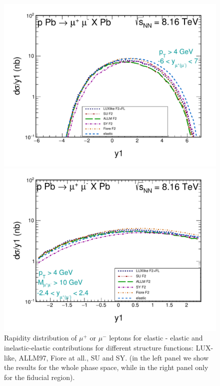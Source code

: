 \begin{figure}[!htbp]
\begin{minipage}{0.47\textwidth}
 \centerline{\includegraphics[width=1.0\textwidth]{figures_Marta/y1.pdf}}
\end{minipage}
\begin{minipage}{0.47\textwidth}
 \centerline{\includegraphics[width=1.0\textwidth]{figures_Marta/y1-c.pdf}}
\end{minipage}

\caption{
Rapidity distribution of $\mu^+$ or $\mu^-$ leptons
for elastic - elastic and inelastic-elastic contributions for different structure functions: LUX-like, ALLM97, Fiore at all., SU and SY. (in the left panel we show the results for the whole phase space, while in the right panel only for the fiducial region).
}
 \label{fig:dsig_dMWW_ineine}
\end{figure}



